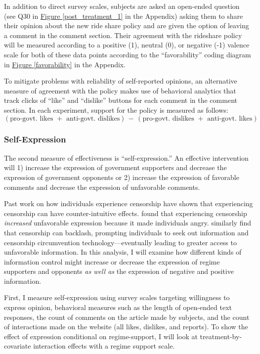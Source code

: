 \documentclass[11pt]{article}
\begin{document}
In addition to direct survey scales, subjects are asked an open-ended question (see Q30 in \hyperref[post_treatment_1]{Figure \ref*{post_treatment_1}} in the Appendix) asking them to share their opinion about the new ride share policy and are given the option of leaving a comment in the comment section. Their agreement with the rideshare policy will be measured according to a positive (1), neutral (0), or negative (-1) valence scale for both of these data points according to the ``favorability'' coding diagram in \hyperref[favorability]{Figure \ref*{favorability}} in the Appendix.

To mitigate problems with reliability of self-reported opinions, an alternative measure of agreement with the policy makes use of behavioral analytics that track clicks of ``like'' and ``dislike'' buttons for each comment in the comment section. In each experiment, support for the policy is measured as follows:
$$(\text{pro-govt. likes } + \text{ anti-govt. dislikes}) \,-\, (\text{pro-govt. dislikes } + \text{ anti-govt. likes})$$

\subsubsection{Self-Expression}

The second measure of effectiveness is ``self-expression.'' An effective intervention will 1) increase the expression of government supporters and decrease the expression of government opponents or 2) increase the expression of favorable comments and decrease the expression of unfavorable comments.

Past work on how individuals experience censorship have shown that experiencing censorship can have counter-intuitive effects. \cite{roberts2015experiencing} found that experiencing censorship {\it increased} unfavorable expression because it made individuals angry. \cite{hobbs2016sudden} similarly find that censorship can backlash, prompting individuals to seek out information and censorship circumvention technology---eventually leading to greater access to unfavorable information. In this analysis, I will examine how different kinds of information control might increase or decrease the expression of regime supporters and opponents {\it as well as} the expression of negative and positive information. 

First, I measure self-expression using survey scales targeting willingness to express opinion, behavioral measures such as the length of open-ended text responses, the count of comments on the article made by subjects, and the count of interactions made on the website (all likes, dislikes, and reports). To show the effect of expression conditional on regime-support, I will look at treatment-by-covariate interaction effects with a regime support scale.
\end{document}
